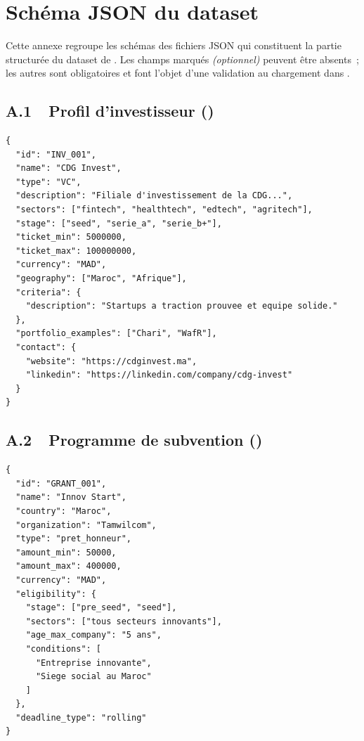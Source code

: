 \chapter{Schéma JSON du dataset}
\label{ann:dataset}

Cette annexe regroupe les schémas des fichiers \ac{JSON} qui constituent la partie structurée du dataset de \tamwil{}. Les champs marqués \textit{(optionnel)} peuvent être absents~; les autres sont obligatoires et font l'objet d'une validation au chargement dans .

\section*{A.1~~Profil d'investisseur ()}

\begin{lstlisting}[caption={Schéma d'un profil d'investisseur.}]
{
  "id": "INV_001",
  "name": "CDG Invest",
  "type": "VC",
  "description": "Filiale d'investissement de la CDG...",
  "sectors": ["fintech", "healthtech", "edtech", "agritech"],
  "stage": ["seed", "serie_a", "serie_b+"],
  "ticket_min": 5000000,
  "ticket_max": 100000000,
  "currency": "MAD",
  "geography": ["Maroc", "Afrique"],
  "criteria": {
    "description": "Startups a traction prouvee et equipe solide."
  },
  "portfolio_examples": ["Chari", "WafR"],
  "contact": {
    "website": "https://cdginvest.ma",
    "linkedin": "https://linkedin.com/company/cdg-invest"
  }
}
\end{lstlisting}

\section*{A.2~~Programme de subvention ()}

\begin{lstlisting}[caption={Schéma d'un programme de subvention.}]
{
  "id": "GRANT_001",
  "name": "Innov Start",
  "country": "Maroc",
  "organization": "Tamwilcom",
  "type": "pret_honneur",
  "amount_min": 50000,
  "amount_max": 400000,
  "currency": "MAD",
  "eligibility": {
    "stage": ["pre_seed", "seed"],
    "sectors": ["tous secteurs innovants"],
    "age_max_company": "5 ans",
    "conditions": [
      "Entreprise innovante",
      "Siege social au Maroc"
    ]
  },
  "deadline_type": "rolling"
}
\end{lstlisting}

